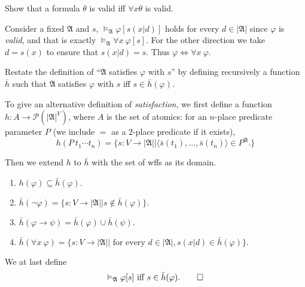 \begin{exercise}{9.3}
  Show that a formula $\theta$ is valid iff $\forall x\theta$ is valid.
\end{exercise}

Consider a fixed $\mathfrak{A}$ and $s$, $\vDash_{\mathfrak{A}}\varphi[s(x|d)]$ holds for every $d\in|\mathfrak{A}|$ since $\varphi$ is \textit{valid}, and that is exactly $\vDash_{\mathfrak{A}}\forall x\ \varphi[s]$. For the other direction we take $d=s(x)$ to ensure that $s(x|d)=s$. Thus $\varphi \Leftrightarrow\forall x\ \varphi$.

\begin{exercise}{9.4}
  Restate the definition of ``$\mathfrak{A}$ satisfies $\varphi$ with $s$'' by defining recursively a function $\overline{h}$ such that $\mathfrak{A}$ satisfies $\varphi$ with $s$ iff $s\in \overline{h}(\varphi).$
\end{exercise}

To give an alternative definition of \textit{satisfaction}, we first define a function $h: A\rightarrow \mathcal{P}(|\mathfrak{A}|^V)$, where $A$ is the set of atomics: for an $n$-place predicate parameter $P$ (we include $=$ as a $2$-place predicate if it exists),
\[
  h(P\ t_1\cdots t_n)=\{s: V\rightarrow|\mathfrak{A}||\langle\bar{s}(t_1),\dots,\bar{s}(t_n)\rangle\in P^{\mathfrak{A}}.\}
\]

Then we extend $h$ to $\bar{h}$ with the set of wffs as its domain.
\begin{enumerate}
  \item $h(\varphi)\subseteq\bar{h}(\varphi).$
  \item $\bar{h}(\neg \varphi)=\{s: V\rightarrow|\mathfrak{A}||s\notin\bar{h}(\varphi)\}.$
  \item $\bar{h}(\varphi\rightarrow \psi)=\bar{h}(\varphi)\cup\bar{h}(\psi).$
  \item $\bar{h}(\forall x\ \varphi)=\{s: V\rightarrow|\mathfrak{A}||\text{ for every }d\in|\mathfrak{A}|, s(x|d)\in\bar{h}(\varphi)\}.$
\end{enumerate}
We at last define
\[
  \vDash_{\mathfrak{A}}\varphi[s]\text{ iff }s\in\bar{h}(\varphi).\qedhere
\]

